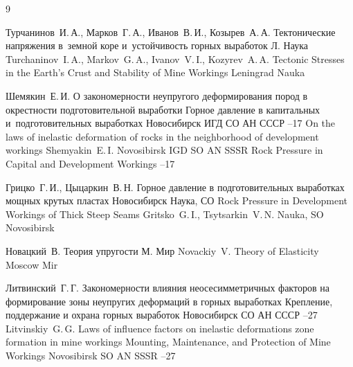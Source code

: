 \begin{thebibliography}{9}

\by Турчанинов~И.\,А., Марков~Г.\,А., Иванов~В.\,И., Козырев~А.\,А.
\book Тектонические напряжения в~земной коре и~устойчивость горных выработок
\publaddr Л.
\publ Наука
\misctransl
\by  Turchaninov~I.\,A., Markov~G.\,A., Ivanov~V.\,I., Kozyrev~A.\,A.
\book Tectonic Stresses in the Earth's Crust and Stability of Mine Workings
\publaddr Leningrad
\publ Nauka

\by Шемякин~Е.\,И.
\paper О закономерности неупругого деформирования пород в окрестности подготовительной выработки 
\inbook Горное давление в капитальных и~подготовительных выработках
\publaddr Новосибирск
\publ ИГД СО АН СССР
--17
\misctransl 
\misctransl
\paper On the laws of inelastic deformation of rocks in the neighborhood of development workings 
\by Shemyakin~E.\,I.
\publaddr Novosibirsk
\publ IGD SO AN SSSR
\inbook Rock Pressure in Capital and Development Workings
--17



\by Грицко~Г.\,И., Цыцаркин~В.\,Н.
\book Горное давление в подготовительных выработках мощных крутых пластах
\publaddr Новосибирск
\publ Наука, СО
\misctransl
\book Rock Pressure in Development Workings of Thick Steep Seams
\by  Gritsko~G.\,I.,  Tsytsarkin~V.\,N.
\publ Nauka, SO
\publaddr  Novosibirsk 

\by Новацкий~В.
\book Теория упругости
\publaddr М.
\publ Мир
\misctransl 
\by Novackiy~V.
\book Theory of Elasticity 
\publaddr Moscow
\publ Mir


\by Литвинский~Г.\,Г.
\paper Закономерности влияния неосесимметричных факторов на формирование зоны неупругих деформаций в горных выработках
\inbook Крепление, поддержание и охрана горных выработок
\publaddr Новосибирск
\publ СО АН СССР
--27
\misctransl 
\by Litvinskiy~G.\,G.
\paper Laws of  influence factors  on inelastic deformations zone formation   in mine workings
\inbook Mounting, Maintenance, and Protection of Mine Workings
\publaddr Novosibirsk
\publ SO AN SSSR 
--27



\end{thebibliography}


\noindent
\hskip6.5cm \thedate \par\noindent
\hskip6.5cm\therevdate

\pagebreak



\makeengtitlem



 \newpage

%
